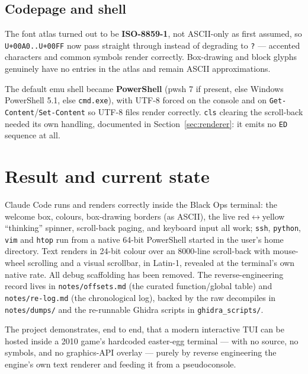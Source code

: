 \documentclass[11pt]{article}
\newcommand{\ic}[1]{\texttt{#1}}
\begin{document}
\subsection{Codepage and shell}

The font atlas turned out to be \textbf{ISO-8859-1}, not ASCII-only as first assumed,
so \ic{U+00A0..U+00FF} now pass straight through instead of degrading to \texttt{?} ---
accented characters and common symbols render correctly. Box-drawing and block glyphs
genuinely have no entries in the atlas and remain ASCII approximations.

The default emu shell became \textbf{PowerShell} (pwsh 7 if present, else Windows
PowerShell 5.1, else \texttt{cmd.exe}), with UTF-8 forced on the console and on
\ic{Get-Content}/\ic{Set-Content} so UTF-8 files render correctly. \texttt{cls} clearing
the scroll-back needed its own handling, documented in Section~\ref{sec:renderer}: it
emits no \ic{ED} sequence at all.

\section{Result and current state}

Claude Code runs and renders correctly inside the Black Ops terminal: the welcome box,
colours, box-drawing borders (as ASCII), the live red$\leftrightarrow$yellow ``thinking''
spinner, scroll-back paging, and keyboard input all work; \texttt{ssh}, \texttt{python},
\texttt{vim} and \texttt{htop} run from a native 64-bit PowerShell started in the user's
home directory. Text renders in 24-bit colour over an 8000-line scroll-back with
mouse-wheel scrolling and a visual scrollbar, in Latin-1, revealed at the terminal's
own native rate. All debug scaffolding has been removed. The reverse-engineering record
lives in \texttt{notes/offsets.md} (the curated function/global table) and
\texttt{notes/re-log.md} (the chronological log), backed by the raw decompiles in
\texttt{notes/dumps/} and the re-runnable Ghidra scripts in \texttt{ghidra_scripts/}.

The project demonstrates, end to end, that a modern interactive TUI can be hosted inside
a 2010 game's hardcoded easter-egg terminal --- with no source, no symbols, and no
graphics-API overlay --- purely by reverse engineering the engine's own text renderer
and feeding it from a pseudoconsole.
\end{document}
